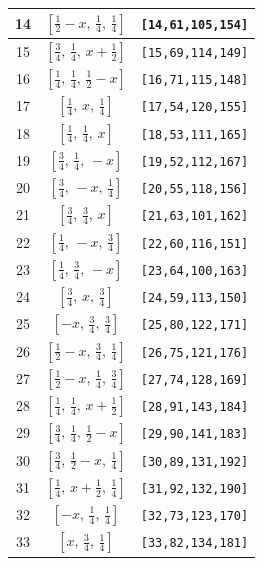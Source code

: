\documentclass[fleqn,8pt]{jsarticle}
\begin{document}
\begin{longtable}{ccc}
14 & $\left[ \frac{1}{2} - x,\, \frac{1}{4},\, \frac{1}{4} \right]$ & {\tt [14,61,105,154]} \\ \hline
15 & $\left[ \frac{3}{4},\, \frac{1}{4},\, x + \frac{1}{2} \right]$ & {\tt [15,69,114,149]} \\ \hline
16 & $\left[ \frac{1}{4},\, \frac{1}{4},\, \frac{1}{2} - x \right]$ & {\tt [16,71,115,148]} \\ \hline
17 & $\left[ \frac{1}{4},\, x,\, \frac{1}{4} \right]$ & {\tt [17,54,120,155]} \\ \hline
18 & $\left[ \frac{1}{4},\, \frac{1}{4},\, x \right]$ & {\tt [18,53,111,165]} \\ \hline
19 & $\left[ \frac{3}{4},\, \frac{1}{4},\, - x \right]$ & {\tt [19,52,112,167]} \\ \hline
20 & $\left[ \frac{3}{4},\, - x,\, \frac{1}{4} \right]$ & {\tt [20,55,118,156]} \\ \hline
21 & $\left[ \frac{3}{4},\, \frac{3}{4},\, x \right]$ & {\tt [21,63,101,162]} \\ \hline
22 & $\left[ \frac{1}{4},\, - x,\, \frac{3}{4} \right]$ & {\tt [22,60,116,151]} \\ \hline
23 & $\left[ \frac{1}{4},\, \frac{3}{4},\, - x \right]$ & {\tt [23,64,100,163]} \\ \hline
24 & $\left[ \frac{3}{4},\, x,\, \frac{3}{4} \right]$ & {\tt [24,59,113,150]} \\ \hline
25 & $\left[ - x,\, \frac{3}{4},\, \frac{3}{4} \right]$ & {\tt [25,80,122,171]} \\ \hline
26 & $\left[ \frac{1}{2} - x,\, \frac{3}{4},\, \frac{1}{4} \right]$ & {\tt [26,75,121,176]} \\ \hline
27 & $\left[ \frac{1}{2} - x,\, \frac{1}{4},\, \frac{3}{4} \right]$ & {\tt [27,74,128,169]} \\ \hline
28 & $\left[ \frac{1}{4},\, \frac{1}{4},\, x + \frac{1}{2} \right]$ & {\tt [28,91,143,184]} \\ \hline
29 & $\left[ \frac{3}{4},\, \frac{1}{4},\, \frac{1}{2} - x \right]$ & {\tt [29,90,141,183]} \\ \hline
30 & $\left[ \frac{3}{4},\, \frac{1}{2} - x,\, \frac{1}{4} \right]$ & {\tt [30,89,131,192]} \\ \hline
31 & $\left[ \frac{1}{4},\, x + \frac{1}{2},\, \frac{1}{4} \right]$ & {\tt [31,92,132,190]} \\ \hline
32 & $\left[ - x,\, \frac{1}{4},\, \frac{1}{4} \right]$ & {\tt [32,73,123,170]} \\ \hline
33 & $\left[ x,\, \frac{3}{4},\, \frac{1}{4} \right]$ & {\tt [33,82,134,181]} \\ \hline

\end{longtable}
\end{document}
